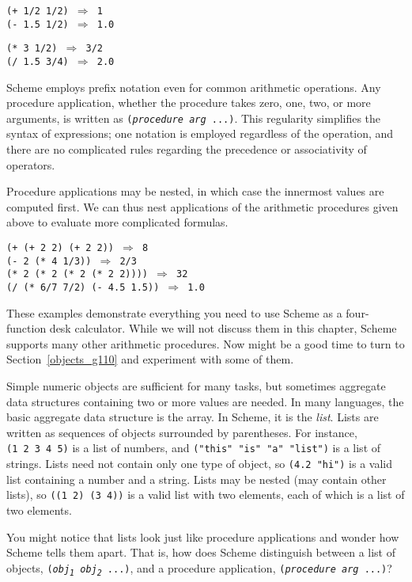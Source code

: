 \begin{alltt}
(+ 1/2 1/2) \(\Rightarrow\) 1
(- 1.5 1/2) \(\Rightarrow\) 1.0

(* 3 1/2) \(\Rightarrow\) 3/2
(/ 1.5 3/4) \(\Rightarrow\) 2.0
\end{alltt}


Scheme employs \label{start_s11}prefix notation even for common arithmetic operations.
Any procedure application, whether the procedure
takes zero, one, two, or more arguments, is written as
\texttt{(\textit{procedure} \textit{arg} ...)}.
This regularity simplifies the syntax of expressions; one notation is
employed regardless of the operation, and there are no complicated rules
regarding the \label{start_s12}precedence
or associativity of operators.


Procedure applications may be nested, in which case the innermost
values are computed first.
We can thus nest applications of the arithmetic procedures given above
to evaluate more complicated formulas. 


\begin{alltt}
(+ (+ 2 2) (+ 2 2)) \(\Rightarrow\) 8
(- 2 (* 4 1/3)) \(\Rightarrow\) 2/3
(* 2 (* 2 (* 2 (* 2 2)))) \(\Rightarrow\) 32
(/ (* 6/7 7/2) (- 4.5 1.5)) \(\Rightarrow\) 1.0
\end{alltt}


These examples demonstrate everything you need to use Scheme as a
four-function desk calculator.
While we will not discuss them in this chapter, Scheme supports
many other arithmetic procedures.
Now might be a good time to turn to Section \ref{objects_g110} and experiment
with some of them.


\label{start_s13}Simple numeric objects are sufficient for many tasks, but
sometimes aggregate data structures containing two or more values
are needed.
In many languages, the basic aggregate data structure is the array.
In Scheme, it is the \textit{list}.
Lists are written as sequences of objects surrounded by parentheses.
For instance, \texttt{(1 2 3 4 5)} is a list of numbers, and
\texttt{("this" "is" "a" "list")} is a list of strings.
Lists need not contain only one type of object, so
\texttt{(4.2 "hi")} is a valid list containing a number and a string.
Lists may be nested (may contain other lists), so \texttt{((1 2) (3 4))} is a
valid list with two
elements, each of which is a list of two elements.


You might notice that lists look just like procedure applications
and wonder how Scheme tells them apart.
That is, how does Scheme distinguish between a list of objects,
\texttt{(\textit{obj\textsubscript{1}} \textit{obj\textsubscript{2}} ...)},
and a \label{start_s14}procedure application,
\texttt{(\textit{procedure} \textit{arg} ...)}?


